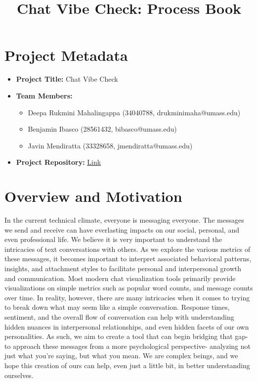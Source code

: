 \documentclass{article}\usepackage{graphicx}
\title{\textbf{Chat Vibe Check: Process Book}}
\begin{document}
\maketitle

\section{Project Metadata}
\begin{itemize}
    \item \textbf{Project Title:} Chat Vibe Check
    \item \textbf{Team Members:} 
    \begin{itemize}
        \item Deepa Rukmini Mahalingappa (34040788, drukminimaha@umass.edu)
        \item Benjamin Ibasco (28561432, bibasco@umass.edu)
        \item Javin Mendiratta (33328658, jmendiratta@umass.edu)
    \end{itemize}
   
    \item \textbf{Project Repository:} \href{https://github.com/bibascoumass/chat-vibe-check}{Link}
\end{itemize}

\section{Overview and Motivation}
In the current technical climate, everyone is messaging everyone. The messages we send and receive can have everlasting impacts on our social, personal, and even professional life. We believe it is very important to understand the intricacies of text conversations with others. As we explore the various metrics of these messages, it becomes important to interpret associated behavioral patterns, insights, and attachment styles to facilitate personal and interpersonal growth and communication. Most modern chat visualization tools primarily provide visualizations on simple metrics such as popular word counts, and message counts over time. In reality, however, there are many intricacies when it comes to trying to break down what may seem like a simple conversation. Response times, sentiment, and the overall flow of conversation can help with understanding hidden nuances in interpersonal relationships, and even hidden facets of our own personalities. As such, we aim to create a tool that can begin bridging that gap- to approach these messages from a more psychological perspective- analyzing not just what you're saying, but what you mean. We are complex beings, and we hope this creation of ours can help, even just a little bit, in better understanding ourselves.
\end{document}

